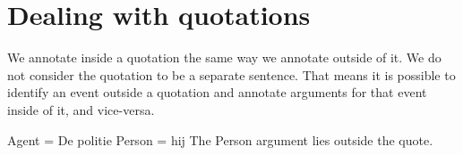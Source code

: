     

\section{Dealing with quotations}

We annotate inside a quotation the same way we annotate outside of it. We do not consider the quotation to be a separate sentence. That means it is possible to identify an event outside a quotation and annotate arguments for that event inside of it, and vice-versa.

\begin{exe}
    \ex {}
        \expl {}
        \expl Agent = De politie
        \expl Person = hij
        \expl The Person argument lies outside the quote.
\end{exe}